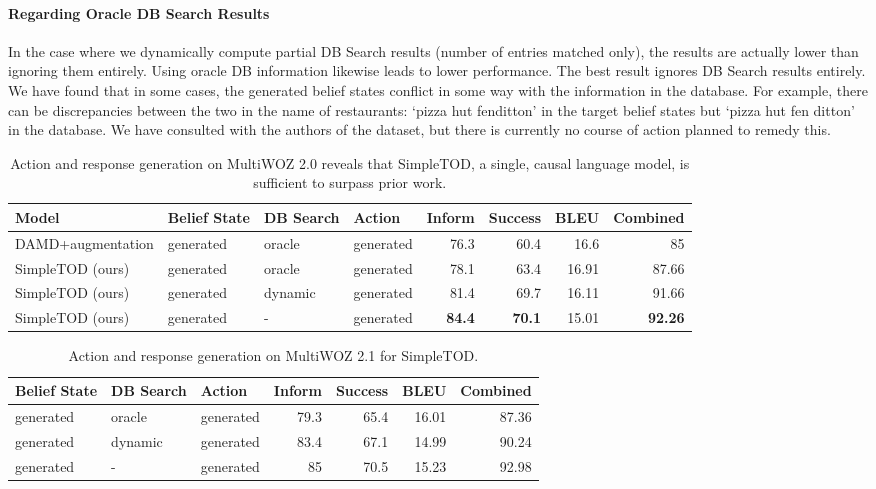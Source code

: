 \documentclass{article}
\begin{document}
\paragraph{Regarding Oracle DB Search Results}
In the case where we dynamically compute partial DB Search results (number of entries matched only), the results are actually lower than ignoring them entirely.
Using oracle DB information likewise leads to lower performance.
The best result ignores DB Search results entirely.
We have found that in some cases, the generated belief states conflict in some way with the information in the database.
For example, there can be discrepancies between the two in the name of restaurants: `pizza hut fenditton' in the target belief states but `pizza hut fen ditton' in the database.
We have consulted with the authors of the dataset,
but there is currently no course of action planned to remedy this.




\begin{table*}[t!]
\centering
\small
\begin{tabular}{llllrrrr}
\hline
Model & Belief State & DB Search & Action & Inform &Success & BLEU & Combined\\
\hline
DAMD+augmentation & generated & oracle  & generated & 76.3 & 60.4 & 16.6 & 85 \\
SimpleTOD (ours) & generated & oracle & generated & 78.1 & 63.4 & 16.91 & 87.66 \\
SimpleTOD (ours) & generated & dynamic & generated & 81.4 & 69.7 & 16.11 & 91.66 \\
SimpleTOD (ours) & generated & - & generated & \textbf{84.4} & \textbf{70.1} & 15.01 & \textbf{92.26} \\
\hline
\end{tabular}
\caption{\label{tab:joint-task-2.0}
Action and response generation on MultiWOZ 2.0 reveals that SimpleTOD, a single, causal language model, is sufficient to surpass prior work. 
}
\end{table*}


\begin{table*}[t!]
\centering
\small
\begin{tabular}{lllrrrr}
\hline
  Belief State & DB Search & Action & Inform &Success & BLEU & Combined\\
\hline
generated & oracle & generated & 79.3 & 65.4 & 16.01 & 87.36 \\
generated & dynamic & generated & 83.4 & 67.1 & 14.99 & 90.24 \\
generated & - & generated & 85 & 70.5 & 15.23 & 92.98 \\
\hline
\end{tabular}
\caption{\label{tab:joint-task-2.1}
Action and response generation on MultiWOZ 2.1 for SimpleTOD. 
}
\end{table*}
 
\end{document}
